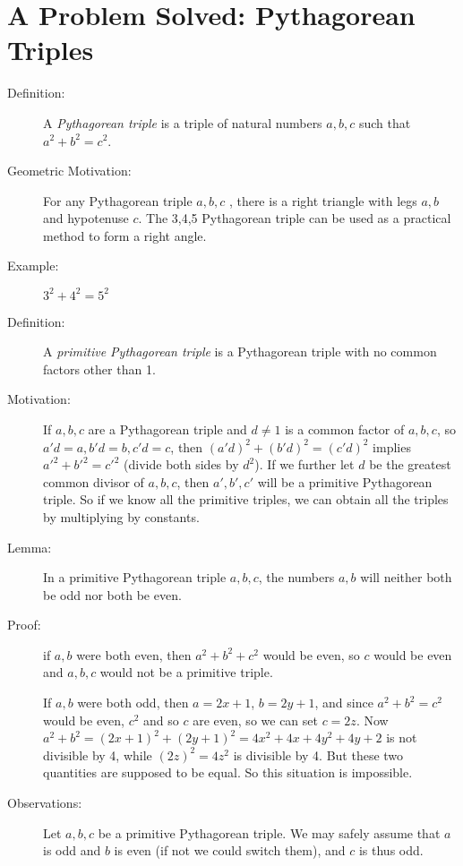 \documentclass[12pt]{article}
\begin{document}
\newpage

\section{A Problem Solved:  Pythagorean Triples}

\begin{description}

\item[Definition:]   A {\em Pythagorean triple\/} is a triple of natural numbers $a,b,c$ such that $a^2+b^2=c^2$.

\item[Geometric Motivation:]   For any Pythagorean triple $a,b,c$ , there is a right triangle with legs $a,b$  and hypotenuse $c$.  The 3,4,5 Pythagorean triple can be used as a practical method to form a right angle.

\item[Example:]  $3^2+4^2=5^2$

\item[Definition:]  A {\em primitive Pythagorean triple\/} is a Pythagorean triple with no common factors other than 1.

\item[Motivation:]  If $a,b,c$ are a Pythagorean triple and $d \neq 1$ is a common factor of $a,b,c$,
so $a'd=a, b'd=b, c'd=c$, then $(a'd)^2 + (b'd)^2 = (c'd)^2$ implies $a'^2+b'^2=c'^2$ (divide both sides by
$d^2$).   If we further let $d$ be the greatest common divisor of $a,b,c$, then $a',b',c'$ will be a primitive Pythagorean triple.   So if we know all the primitive triples, we can obtain all the triples by multiplying by constants.

\item[Lemma:]  In a primitive Pythagorean triple $a,b,c$, the numbers $a,b$ will neither both be odd nor both be even.

\item[Proof:]  if $a,b$ were both even, then $a^2+b^2+c^2$ would be even, so $c$ would be even and
$a,b,c$ would not be a primitive triple.

If $a,b$ were both odd, then $a=2x+1$, $b=2y+1$, and since $a^2+b^2=c^2$ would be even, $c^2$ and so $c$
are even, so we can set $c=2z$.   Now $a^2+b^2=(2x+1)^2+(2y+1)^2 = 4x^2+4x+4y^2+4y+2$ is not divisible by 4, while $(2z)^2= 4z^2$ is divisible by 4.  But these two quantities are supposed to be equal.  So this situation is impossible.

\item[Observations:]  Let $a,b,c$ be a primitive Pythagorean triple.   We may safely assume that $a$ is odd and $b$ is even (if not we could switch them), and $c$ is thus odd.


\end{description}
\end{document}

